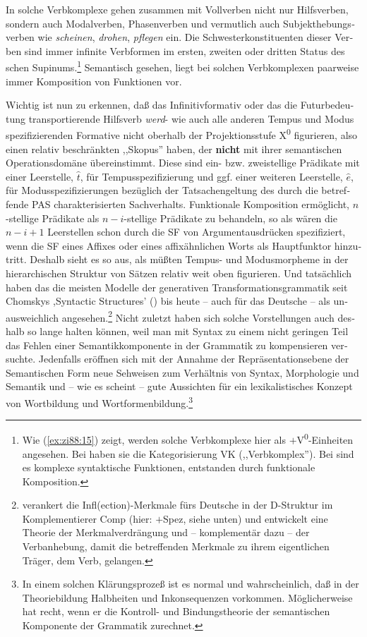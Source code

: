 \documentclass[output=paper,colorlinks,citecolor=brown, booklanguage=german]{langscibook}
\begin{document}
\begin{otherlanguage}{german}
\noindent In solche Verbkomplexe gehen zusammen mit Vollverben nicht nur Hilfsverben, sondern auch Modalverben, Phasenverben und vermutlich auch Sub\-jekt\-he\-bungsverben wie \textit{scheinen}, \textit{drohen}, \textit{pflegen} ein. Die Schwesterkonstituenten dieser Verben sind immer infinite Verbformen im ersten, zweiten oder dritten Status des \citeauthor{Bech1955}schen Supinums.\footnote{Wie (\ref{ex:zi88:15}) zeigt, werden solche Verbkomplexe hier als $+$V\textsuperscript{0}-Einheiten angesehen. Bei \citet{Haider1986b} haben sie die Kategorisierung VK (,,Verbkomplex''). Bei \citet{Steedman1985} sind es komplexe syntaktische Funktionen, entstanden durch funktionale Komposition.} Semantisch gesehen, liegt bei solchen Verbkomplexen paarweise immer Komposition von Funktionen vor.

Wichtig ist nun zu erkennen, daß das Infinitivformativ oder das die Futurbedeutung transportierende Hilfsverb \textit{werd}- wie auch alle anderen Tempus und Modus spezifizierenden Formative nicht oberhalb der Projektionsstufe X\textsuperscript{0} fi\-gu\-rie\-ren, also einen relativ beschränkten ,,Skopus'' haben, der \textbf{nicht} mit ihrer semantischen Operationsdomäne übereinstimmt. Diese sind ein- bzw. zweistellige Prädikate mit einer Leerstelle, $\hat{t}$, für Tempusspezifizierung und ggf. einer wei\-te\-ren Leerstelle, $\hat{e}$, für Modusspezifizierungen bezüglich der Tatsachengeltung des durch die betreffende PAS charakterisierten Sachverhalts. Funktionale Komposition ermöglicht, $n$-stellige Prädikate als $n-i$-stellige Prädikate zu behandeln, so als wären die $n-i + 1$ Leerstellen schon durch die SF von Argumentausdrücken spezifiziert, wenn die SF eines Affixes oder eines affixähnlichen Worts als Haupt\-funktor hinzutritt. Deshalb sieht es so aus, als müßten Tempus- und Modusmorpheme in der hierarchischen Struktur von Sätzen relativ weit oben fi\-gu\-rie\-ren. Und tatsächlich haben das die meisten Modelle der generativen Trans\-for\-ma\-tions\-gram\-ma\-tik seit Chomskys ,Syntactic Structures' (\citeyear{Chomsky1957}) bis heute -- auch für das Deutsche -- als unausweichlich angesehen.\footnote{\citet{Haider1986b,Haider1986a} verankert die Infl(ection)-Merkmale fürs Deutsche in der D-Struktur im Komplementierer Comp (hier: $+$Spez, siehe unten) und entwickelt eine Theorie der Merkmalverdrängung und -- komplementär dazu -- der Verbanhebung, damit die betreffenden Merkmale zu ihrem eigentlichen Träger, dem Verb, gelangen.} Nicht zuletzt haben sich solche Vorstellungen auch deshalb so lange halten können, weil man mit Syntax zu einem nicht geringen Teil das Fehlen einer Semantikkomponente in der Grammatik zu kompensieren versuchte. Jedenfalls eröffnen sich mit der Annahme der Repräsentationsebene der Semantischen Form neue Sehweisen zum Verhältnis von Syntax, Morphologie und Semantik und -- wie es scheint -- gute Aussichten für ein lexikalistisches Konzept von Wortbildung und Wortformenbildung.\footnote{\label{fn:zi88:19} In einem solchen Klärungsprozeß ist es normal und wahrscheinlich, daß in der Theoriebildung Halbheiten und Inkonsequenzen vorkommen. Möglicherweise hat \citet{Jackendoff1987} recht, wenn er die Kontroll- und Bindungstheorie der semantischen Komponente der Grammatik zurechnet.}


\end{otherlanguage}
\end{document}
